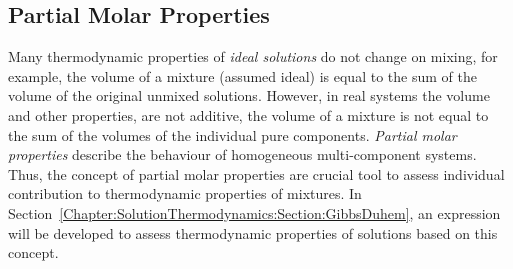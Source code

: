 \subsection{Partial Molar Properties}\label{Chapter:VLE:PartialMolarProperties}
Many thermodynamic properties of {\it ideal solutions} do not change on mixing, for example, the volume of a mixture (assumed ideal) is equal to the sum of the volume of the original unmixed solutions. However, in real systems the volume and other properties, are not additive, \ie the volume of a mixture is not equal to the sum of the volumes of the individual pure components. {\it Partial molar properties} describe the behaviour of homogeneous multi-component systems. Thus, the concept of partial molar properties are crucial tool to assess individual contribution to thermodynamic properties of mixtures. In Section~\ref{Chapter:SolutionThermodynamics:Section:GibbsDuhem}, an expression will be developed to assess thermodynamic properties of solutions based on this concept. 

